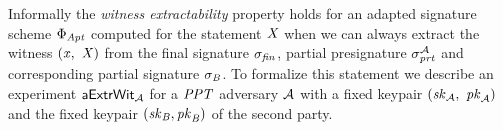 \begin{definition}
    Informally the \textit{witness extractability} property holds for an adapted signature scheme $\Phi_{\mathit{Apt}}$ computed for the statement $\mathit{X}$ when we can always extract the witness
    $(\mathit{x} ,~ \mathit{X})$ from the final signature $\sigma_{\mathit{fin}}$, partial presignature $\sigma_{\mathit{prt}}^{\mathcal{A}}$ and corresponding partial signature $\sigma_{\mathit{B}}$.
    To formalize this statement we describe an experiment $\mathsf{aExtrWit_{\mathcal{A}}}$ for a $\mathit{PPT}$ adversary $\mathcal{A}$ with a fixed keypair $(\mathit{sk}_{\mathcal{A}} ,~ \mathit{pk}_{\mathcal{A}})$
    and the fixed keypair $(\mathit{sk}_{\mathit{B}}, \mathit{pk}_{\mathit{B}})$ of the second party.\\
    \begin{center}
        \fbox{
            \begin{varwidth}{\textwidth}
                \procedure[linenumbering, syntaxhighlight=auto]{$\procExpExt{\varN}$} {
                    \varSet \opAssign \cnstEmptySet \\
                    (\varNonceAdv \opSeperate \varRandAdv) \opFunResult \procSetupPartSig{\varSecParam} \\
                    (\varMsg \opSeperate \varStatement) \opFunResult \cnstAdversary^{\procNonceOracle{\cdot},\procSignPtOracle{\cdot}{\varPubKeyAdv}{\varRandAdv}}(\varPubKeyAdv \opSeperate \varRandAdv) \\
                    \varSigPartAdv \opFunResult \procGenPtAptSig{\varMsg}{\varSecKeyAdv}{\varNonceAdv}{\varPubKeyBob}{\varRandBob}{\varWit} \\
                    (\varSigBob) \opFunResult \cnstAdversary^{\procNonceOracle{\cdot},\procSignPtOracle{\cdot}{\varPubKeyAdv}{\varRandAdv}}(\varPubKeyAdv \opSeperate \varRandAdv \opSeperate \varSigPartAdv) \\
                    \varSigFin \opFunResult \procFinAptSig{\varSigPartAdv}{\varSigBob}{\varRandAdv}{\varRandBob}{\varWit} \\
                    \funStar{\varWit} \opFunResult \procExtWit{\varSigFin}{\varSigBob}{\varSigPartAdv} \\
                    \pcreturn (\varMsg \opNotIn \varSet \opAnd (\varStatement \opSeperate \funStar{\varWit}) \opNotIn \cnstRelation \opAnd \procVerf{\varMsg}{\varSigFin}{\varPubKeyAdv \opAddPoint \varPubKeyBob})
                }\\


\end{varwidth}}
\end{center}
\end{definition}
